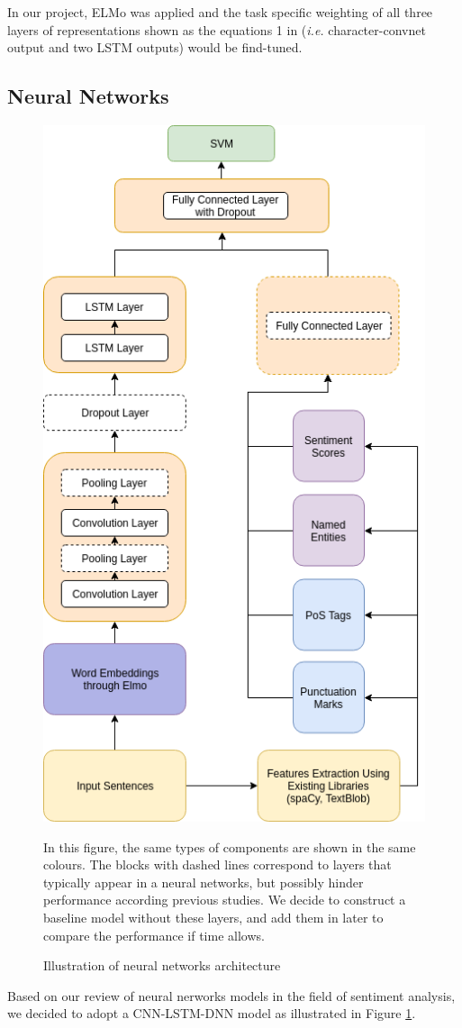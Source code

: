 \documentclass[12pt]{diazessay} %
\begin{document}
In our project, ELMo was applied and the task specific weighting of all three layers of representations shown as the equations 1 in  \citet{peters2018deep} (\textit{i.e.} character-convnet output and two LSTM outputs) would be find-tuned.


\subsection{Neural Networks}
\begin{figure}[ht!]
	\includegraphics[height=0.7\textheight, center]{graphs/nn_architecture.png}
	\caption{Illustration of neural networks architecture}
	\medskip
	\small
	In this figure, the same types of components are shown in the same colours. The blocks with dashed lines correspond to layers that typically appear in a neural networks, but possibly hinder performance according previous studies. We decide to construct a baseline model without these layers, and add them in later to compare the performance if time allows. 
	\label{figure:nnarchitecture}
\end{figure}
Based on our review of neural nerworks models in the field of sentiment analysis, we decided to adopt a CNN-LSTM-DNN model as illustrated in Figure \ref{figure:nnarchitecture}. 
\end{document}
